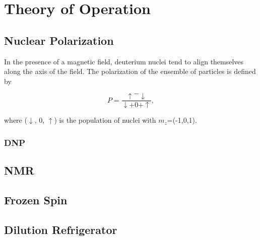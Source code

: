 \chapter{Theory of Operation} 
\label{theory}  
\section{Nuclear Polarization}
In the presence of a magnetic field, deuterium nuclei tend to align themselves along the axis of the field.  The polarization of the ensemble of particles is defined by 

$$P=\frac{\uparrow-\downarrow}{\downarrow+0+\uparrow},$$

where ($\downarrow$, $0$, $\uparrow$) is the population of nuclei with $m_z$=(-1,0,1).
 \subsection{DNP}

\section{NMR}

\section{Frozen Spin} 
 
\section{Dilution Refrigerator} 

